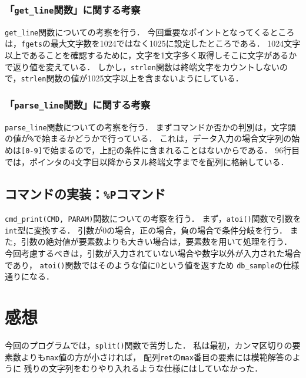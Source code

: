 \documentclass[autodetect-engine,dvi=dvipdfmx,ja=standard,
               a4j,11pt]{bxjsarticle}
\begin{document}
\subsubsection{「\texttt{get\_line}関数」に関する考察}

\verb|get_line|関数についての考察を行う．
今回重要なポイントとなってくるところは，\verb|fgets|の最大文字数を1024ではなく1025に設定したところである．
1024文字以上であることを確認するために，文字を1文字多く取得しそこに文字があるかで返り値を変えている．
しかし，\verb|strlen|関数は終端文字をカウントしないので，\verb|strlen|関数の値が1025文字以上を含まないようにしている．

\subsubsection{「\texttt{parse\_line}関数」に関する考察}

\verb|parse_line|関数についての考察を行う．
まずコマンドか否かの判別は，文字頭の値が\verb|%|で始まるかどうかで行っている．
これは，データ入力の場合文字列の始めは\verb|[0-9]|で始まるので，上記の条件に含まれることはないからである．
96行目では，ポインタの4文字目以降からヌル終端文字までを配列に格納している．


\subsection{コマンドの実装：\texttt{\%P}コマンド}

\verb|cmd_print(CMD, PARAM)|関数についての考察を行う．
まず，\verb|atoi()|関数で引数を\verb|int|型に変換する．
引数が0の場合，正の場合，負の場合で条件分岐を行う．
また，引数の絶対値が要素数よりも大きい場合は，要素数を用いて処理を行う．
今回考慮するべきは，引数が入力されていない場合や数字以外が入力された場合であり，
\verb|atoi()|関数ではそのような値に$0$という値を返すため
\verb|db_sample|の仕様通りになる．


\section{感想} \label{sec:6}

今回のプログラムでは，\verb|split()|関数で苦労した．
私は最初，カンマ区切りの要素数よりも\verb|max|値の方が小さければ，
配列\verb|ret|の\verb|max|番目の要素には模範解答のように
残りの文字列をむりやり入れるような仕様にはしていなかった．
\end{document}
